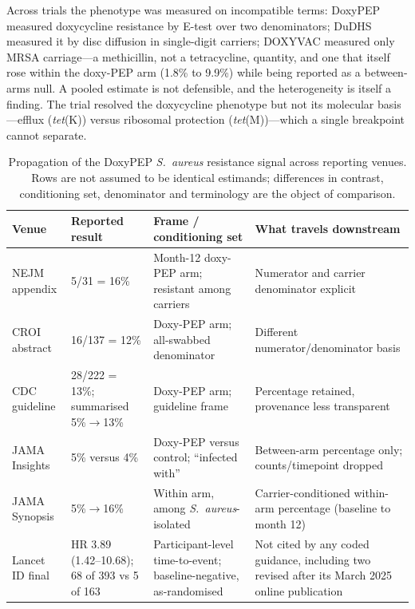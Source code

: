 \documentclass[12pt,a4paper]{article}
\newcommand{\sa}{\emph{S.~aureus}}
\begin{document}
Across trials the phenotype was measured on incompatible terms: DoxyPEP measured
doxycycline resistance by E-test over two denominators; DuDHS measured it by disc
diffusion in single-digit carriers; DOXYVAC measured only MRSA carriage---a
methicillin, not a tetracycline, quantity, and one that itself rose within the
doxy-PEP arm (1.8\% to 9.9\%) while being reported as a between-arms
null.\cite{vanbaelen2024c} A pooled estimate is not defensible, and the
heterogeneity is itself a finding. The trial resolved the doxycycline phenotype
but not its molecular basis---efflux (\emph{tet}(K)) versus ribosomal protection
(\emph{tet}(M))---which a single breakpoint cannot separate.\cite{liu2011,grossman2016}

\begin{table}[t]
\centering
\caption{Propagation of the DoxyPEP \sa{} resistance signal across reporting
venues. Rows are not assumed to be identical estimands; differences in contrast,
conditioning set, denominator and terminology are the object of comparison.}
\label{tab:propagation}
\small
\begin{tabularx}{\textwidth}{@{}lllX@{}}
\toprule
Venue & Reported result & Frame / conditioning set & What travels downstream\\
\midrule
NEJM appendix\cite{luetkemeyer2023} & 5/31 = 16\% & Month-12 doxy-PEP arm; resistant among carriers & Numerator and carrier denominator explicit\\
CROI abstract\cite{luetkemeyer2023croi} & 16/137 = 12\% & Doxy-PEP arm; all-swabbed denominator & Different numerator/denominator basis\\
CDC guideline\cite{cdc2024doxypep} & 28/222 = 13\%; summarised 5\%$\rightarrow$13\% & Doxy-PEP arm; guideline frame & Percentage retained, provenance less transparent\\
JAMA Insights\cite{mayer2023} & 5\% versus 4\% & Doxy-PEP versus control; ``infected with'' & Between-arm percentage only; counts/timepoint dropped\\
JAMA Synopsis\cite{flores2025} & 5\%$\rightarrow$16\% & Within arm, among \sa{}-isolated & Carrier-conditioned within-arm percentage (baseline to month 12)\\
Lancet ID final\cite{luetkemeyer2025} & HR 3.89 (1.42--10.68); 68 of 393 vs 5 of 163 & Participant-level time-to-event; baseline-negative, as-randomised & Not cited by any coded guidance, including two revised after its March 2025 online publication\\
\bottomrule
\end{tabularx}
\end{table}
\end{document}

